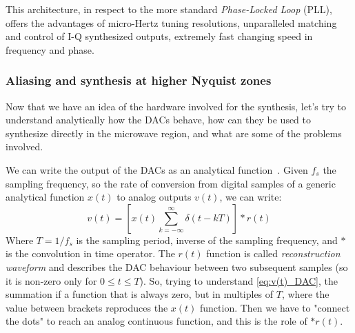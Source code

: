 This architecture, in respect to the more standard \textit{Phase-Locked Loop} (PLL), offers the advantages of micro-Hertz tuning resolutions, unparalleled matching and control of I-Q synthesized outputs, extremely fast changing speed in frequency and phase.


\subsubsection{Aliasing and synthesis at higher Nyquist zones}\label{sec:aliasing}
Now that we have an idea of the hardware involved for the synthesis, let's try to understand analytically how the DACs behave, how can they be used to synthesize directly in the microwave region, and what are some of the problems involved. 

We can write the output of the DACs as an analytical function~\cite{Kalfus2020}.
Given $f_s$ the sampling frequency, so the rate of conversion from digital samples of a generic analytical function $x(t)$ to analog outputs $v(t)$, we can write:
\begin{equation}\label{eq:v(t)_DAC}
    v(t) = \left[ x(t) \sum^\infty_{k=-\infty} \delta (t - kT) \right] * r(t)
\end{equation}
Where $T=1/f_s$ is the sampling period, inverse of the sampling frequency, and $*$ is the convolution in time operator.
The $r(t)$ function is called \textit{reconstruction waveform} and describes the DAC behaviour between two subsequent samples (so it is non-zero only for $0\le t \le T$).
So, trying to understand \cref{eq:v(t)_DAC}, the summation if a function that is always zero, but in multiples of $T$, where the value between brackets reproduces the $x(t)$ function. Then we have to "connect the dots" to reach an analog continuous function, and this is the role of $*r(t)$.

